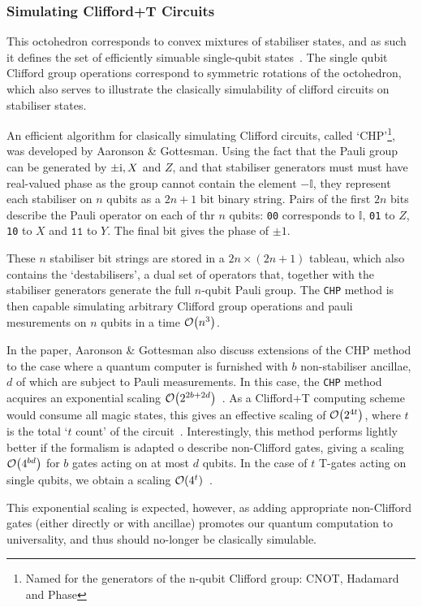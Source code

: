 \documentclass{standalone}
\begin{document}
\subsubsection{Simulating Clifford+T Circuits}\label{sec:CHP}
This octohedron corresponds to convex mixtures of stabiliser states, and as such it defines the set of efficiently simuable single-qubit states~\cite{Howard2014}. The single qubit Clifford group operations correspond to symmetric rotations of the octohedron, which also serves to illustrate the clasically simulability of clifford circuits on stabiliser states. 
\par
An efficient algorithm for clasically simulating Clifford circuits, called `CHP'\footnote{Named for the generators of the n-qubit Clifford group: CNOT, Hadamard and Phase}, was developed by Aaronson \& Gottesman. Using the fact that the Pauli group can be generated by $\pm\mathrm{i}, X$ and $Z$, and that stabiliser generators must must have real-valued phase as the group cannot contain the element $-\mathbb{I}$, they represent each stabiliser on $n$ qubits as a $2n+1$ bit binary string. Pairs of the first $2n$ bits describe the Pauli operator on each of thr $n$ qubits: \texttt{00} corresponds to $\mathbb{I}$, \texttt{01} to $Z$, \texttt{10} to $X$ and $\texttt{11}$ to $Y$. The final bit gives the phase of $\pm 1$.
\par
These $n$ stabiliser bit strings are stored in a $2n\times(2n+1)$ tableau, which also contains the `destabilisers', a dual set of operators that, together with the stabiliser generators generate the full $n$-qubit Pauli group. The \texttt{CHP} method is then capable simulating arbitrary Clifford group operations and pauli mesurements on $n$ qubits in a time $\order{n^{3}}$.
\par
In the paper, Aaronson \& Gottesman also discuss extensions of the CHP method to the case where a quantum computer is furnished with $b$ non-stabiliser ancillae, $d$ of which are subject to Pauli measurements. In this case, the \texttt{CHP} method acquires an exponential scaling $\order{2^{2b+2d}}$~\cite{Aaronson2004a}. As a Clifford+T computing scheme would consume all magic states, this gives an effective scaling of $\order{2^{4t}}$, where $t$ is the total `$t$ count' of the circuit~\cite{Bravyi2015,Aaronson2004a}. Interestingly, this method performs lightly better if the formalism is adapted o describe non-Clifford gates, giving a scaling $\order{4^{bd}}$ for $b$ gates acting on at most $d$ qubits. In the case of $t$ T-gates acting on single qubits, we obtain a scaling $\order{4^{t}}$~\cite{Aaronson2004a}.
\par
This exponential scaling is expected, however, as adding appropriate non-Clifford gates (either directly or with ancillae) promotes our quantum computation to universality, and thus should no-longer be clasically simulable.
\ifstandalone 

\fi
\end{document}
